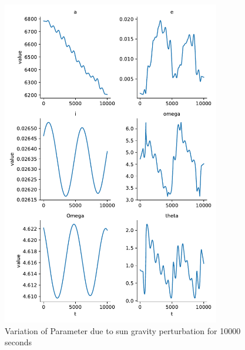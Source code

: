 \begin{figure}[H]
    \centering
    \includegraphics[width=0.85\textwidth]{../Figure/Q2/orbital_elements_variation_sun_10000}
    \caption{Variation of Parameter due to sun gravity perturbation for 10000 seconds}
\end{figure}

